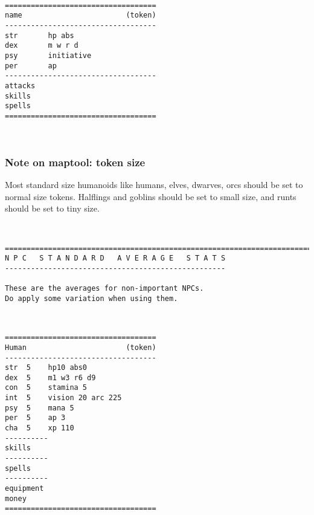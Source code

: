 \

\goodbreak \begin{samepage} \small \begin{verbatim}
===================================
name                        (token)
-----------------------------------
str       hp abs
dex       m w r d
psy       initiative
per       ap
-----------------------------------
attacks
skills
spells
===================================
\end{verbatim} \normalsize \end{samepage}

\

\subsubsection*{Note on maptool: token size}
Most standard size humanoids like humans, elves, dwarves, orcs should be set to  normal size tokens. Halflings and goblins should be set to small size, and runts should be set to tiny size.

\






 {}
\goodbreak \small \begin{samepage} \begin{verbatim}
================================================================================
N P C   S T A N D A R D   A V E R A G E   S T A T S
---------------------------------------------------

These are the averages for non-important NPCs.
Do apply some variation when using them.
\end{verbatim} \end{samepage} \normalsize

\

\goodbreak \small \begin{samepage} \begin{verbatim}
===================================
Human                       (token)
-----------------------------------
str  5    hp10 abs0
dex  5    m1 w3 r6 d9
con  5    stamina 5
int  5    vision 20 arc 225
psy  5    mana 5
per  5    ap 3
cha  5    xp 110
----------
skills
----------
spells
----------
equipment
money
===================================
\end{verbatim} \end{samepage} \normalsize

